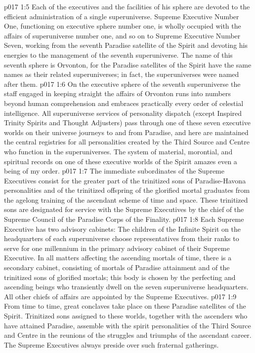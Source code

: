 \vs p017 1:5 Each of the executives and the facilities of his sphere are devoted to the efficient administration of a single superuniverse. Supreme Executive Number One, functioning on executive sphere number one, is wholly occupied with the affairs of superuniverse number one, and so on to Supreme Executive Number Seven, working from the seventh Paradise satellite of the Spirit and devoting his energies to the management of the seventh superuniverse. The name of this seventh sphere is Orvonton, for the Paradise satellites of the Spirit have the same names as their related superuniverses; in fact, the superuniverses were named after them.
\vs p017 1:6 On the executive sphere of the seventh superuniverse the staff engaged in keeping straight the affairs of Orvonton runs into numbers beyond human comprehension and embraces practically every order of celestial intelligence. All superuniverse services of personality dispatch (except Inspired Trinity Spirits and Thought Adjusters) pass through one of these seven executive worlds on their universe journeys to and from Paradise, and here are maintained the central registries for all personalities created by the Third Source and Centre who function in the superuniverses. The system of material, morontial, and spiritual records on one of these executive worlds of the Spirit amazes even a being of my order.
\vs p017 1:7 The immediate subordinates of the Supreme Executives consist for the greater part of the trinitized sons of Paradise\hyp{}Havona personalities and of the trinitized offspring of the glorified mortal graduates from the agelong training of the ascendant scheme of time and space. These trinitized sons are designated for service with the Supreme Executives by the chief of the Supreme Council of the Paradise Corps of the Finality.
\vs p017 1:8 Each Supreme Executive has two advisory cabinets: The children of the Infinite Spirit on the headquarters of each superuniverse choose representatives from their ranks to serve for one millennium in the primary advisory cabinet of their Supreme Executive. In all matters affecting the ascending mortals of time, there is a secondary cabinet, consisting of mortals of Paradise attainment and of the trinitized sons of glorified mortals; this body is chosen by the perfecting and ascending beings who transiently dwell on the seven superuniverse headquarters. All other chiefs of affairs are appointed by the Supreme Executives.
\vs p017 1:9 \pc From time to time, great conclaves take place on these Paradise satellites of the Spirit. Trinitized sons assigned to these worlds, together with the ascenders who have attained Paradise, assemble with the spirit personalities of the Third Source and Centre in the reunions of the struggles and triumphs of the ascendant career. The Supreme Executives always preside over such fraternal gatherings.
